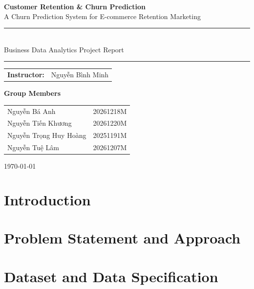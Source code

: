 \documentclass[a4paper,11pt]{report}
\begin{document}
\begin{titlepage}
    \centering
    \vspace*{3cm}

    {\LARGE\bfseries Customer Retention \& Churn Prediction}\\[0.4cm]
    {\Large A Churn Prediction System for E-commerce Retention Marketing}\\[2cm]

    \rule{0.8\linewidth}{0.6pt}\\[0.5cm]
    {\large Business Data Analytics Project Report}\\[0.2cm]
    \rule{0.8\linewidth}{0.6pt}

    \vfill

    \begin{tabular}{ll}
        \textbf{Instructor:} & Nguyễn Bình Minh \\
    \end{tabular}

    \vspace{0.8cm}

    \textbf{Group Members}\\[0.3cm]
    \begin{tabular}{ll}
        Nguyễn Bá Anh & 20261218M \\
        Nguyễn Tiến Khương & 20261220M \\
        Nguyễn Trọng Huy Hoàng & 20251191M \\
        Nguyễn Tuệ Lâm & 20261207M \\
    \end{tabular}

    \vspace{1cm}
    {\large \today}

    \vspace*{1cm}
\end{titlepage}

\tableofcontents

\chapter{Introduction}
\label{ch:introduction}


\chapter{Problem Statement and Approach}
\label{ch:problem-approach}


\chapter{Dataset and Data Specification}
\label{ch:dataset}

\end{document}

